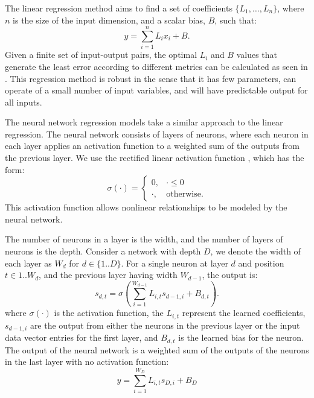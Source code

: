 The linear regression method aims to find 
a set of coefficients $\{L_1, \ldots, L_n\}$, where $n$ is the size of the input dimension,
and a scalar bias, $B$, such that:
\begin{equation}
y = \sum_{i=1}^{n} L_i x_i + B.
\end{equation}
Given a finite set of input-output pairs, 
the optimal $L_i$ and $B$ values that generate the least error
according to different metrics can be calculated as seen in \cite{Maulud2020}.
This regression method is robust in the sense that it has few parameters, can operate of a small number of
input variables, and will have predictable output for all inputs.

The neural network regression models take a similar approach to the linear regression.
The neural network consists of layers of neurons, where each neuron in each layer
applies an activation function to a weighted sum of the outputs from the previous layer.
We use the rectified linear activation function \cite{Hu2019}, which has the form:
\begin{equation}
\sigma(\cdot) = \begin{cases} 
0, &\cdot \leq 0 \\ \cdot, &\mathrm{otherwise.} \end{cases}
\end{equation}
This activation function allows nonlinear relationships to be modeled by the neural network.

The number of neurons in a layer is the width, and the number of layers of neurons is the depth.
Consider a network with depth $D$, we denote the width of each layer as $W_d$ for $d \in \{1..D\}$.
For a single neuron at layer $d$ and position $t \in {1..W_d}$,
 and the previous layer having width $W_{d-1}$, the output is:
\begin{equation}
s_{d,t} = \sigma( \sum_{i=1}^{W_{d-1}} L_{i,t} s_{d-1,i} + B_{d,t} ).
\end{equation}
where $\sigma(\cdot)$ is the activation function, the $L_{i,t}$ represent the
learned coefficients, $s_{d-1,i}$ are the output from either the neurons in the previous layer 
or the input data vector entries for the first layer,
and $B_{d,t}$  is the learned bias for the neuron. 
The output of the neural network is a weighted sum of the outputs 
of the neurons in the last layer with no activation function:
\begin{equation}
y = \sum_{i=1}^{W_D} L_{i,t} s_{D,i} + B_D
\end{equation}

